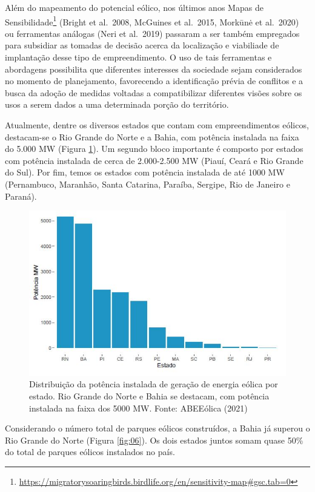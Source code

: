 \documentclass[
  oneside]{scrbook}
\DeclareRobustCommand{\href}[2]{#2\footnote{\url{#1}}}
\begin{document}
Além do mapeamento do potencial eólico, nos últimos anos \href{https://migratorysoaringbirds.birdlife.org/en/sensitivity-map\#gsc.tab=0}{Mapas de Sensibilidade} (Bright et al.~2008, McGuines et al.~2015, Morkūnė et al.~2020) ou ferramentas análogas (Neri et al.~2019) passaram a ser também empregados para subsidiar as tomadas de decisão acerca da localização e viabiliade de implantação desse tipo de empreendimento. O uso de tais ferramentas e abordagens possibilita que diferentes interesses da sociedade sejam considerados no momento de planejamento, favorecendo a identificação prévia de conflitos e a busca da adoção de medidas voltadas a compatibilizar diferentes visões sobre os usos a serem dados a uma determinada porção do território.

Atualmente, dentre os diversos estados que contam com empreendimentos eólicos, destacam-se o Rio Grande do Norte e a Bahia, com potência instalada na faixa do 5.000 MW (Figura \ref{fig:05}). Um segundo bloco importante é composto por estados com potência instalada de cerca de 2.000-2.500 MW (Piauí, Ceará e Rio Grande do Sul). Por fim, temos os estados com potência instalada de até 1000 MW (Pernambuco, Maranhão, Santa Catarina, Paraíba, Sergipe, Rio de Janeiro e Paraná).

\begin{figure}[H]

{\centering \includegraphics[width=0.8\linewidth]{imagens/cap01/Figura_1.5} 

}

\caption{Distribuição da potência instalada de geração de energia eólica por estado. Rio Grande do Norte e Bahia se destacam, com potência instalada na faixa dos 5000 MW. Fonte: ABEEólica (2021)}\label{fig:05}
\end{figure}

Considerando o número total de parques eólicos construídos, a Bahia já superou o Rio Grande do Norte (Figura \ref{fig:06}). Os dois estados juntos somam quase 50\% do total de parques eólicos instalados no país.
\end{document}
